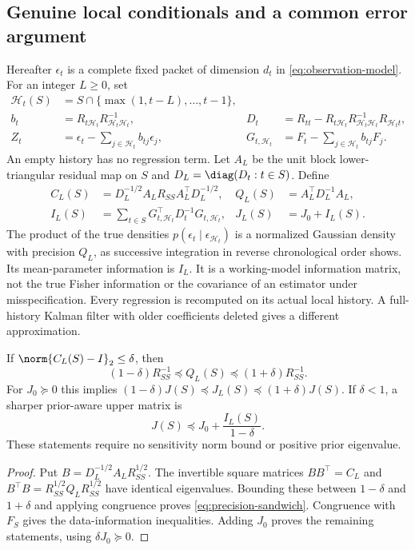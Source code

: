 \subsection{Genuine local conditionals and a common error argument}
\label{subsec:local-conditionals}
Hereafter $\epsilon_t$ is a complete fixed packet of dimension $d_t$ in
\eqref{eq:observation-model}. For an integer $L\ge0$, set
\begin{align}
 \mathcal H_t(S)&=S\cap\{\max(1,t-L),\ldots,t-1\},\nonumber\\
 b_t&=R_{t\mathcal H_t}R_{\mathcal H_t\mathcal H_t}^{-1},&
 D_t&=R_{tt}-R_{t\mathcal H_t}R_{\mathcal H_t\mathcal H_t}^{-1}
                       R_{\mathcal H_t t},\nonumber\\
 Z_t&=\epsilon_t-\sum_{j\in\mathcal H_t}b_{tj}\epsilon_j,&
 G_{t,\mathcal H_t}&=F_t-\sum_{j\in\mathcal H_t}b_{tj}F_j.
 \label{eq:local-conditionals}
\end{align}
An empty history has no regression term. Let $A_L$ be the unit block
lower-triangular residual map on $S$ and $D_L=\diag(D_t:t\in S)$. Define
\begin{align}
 C_L(S)&=D_L^{-1/2}A_LR_{SS}A_L^\top D_L^{-1/2},&
 Q_L(S)&=A_L^\top D_L^{-1}A_L,\nonumber\\
 I_L(S)&=\sum_{t\in S}G_{t,\mathcal H_t}^\top D_t^{-1}G_{t,\mathcal H_t},&
 J_L(S)&=J_0+I_L(S).
 \label{eq:local-precision}
\end{align}
The product of the true densities $p(\epsilon_t\mid\epsilon_{\mathcal H_t})$
is a normalized Gaussian density with precision $Q_L$, as successive
integration in reverse chronological order shows. Its mean-parameter
information is $I_L$. It is a working-model information matrix, not the true
Fisher information or the covariance of an estimator under misspecification.
Every regression is recomputed on its actual local history. A full-history
Kalman filter with older coefficients deleted gives a different approximation.

\begin{lemma}
\label{lem:residual-transfer}
If $\norm{C_L(S)-I}_2\le\delta$, then
\begin{equation}
 (1-\delta)R_{SS}^{-1}\preceq Q_L(S)\preceq(1+\delta)R_{SS}^{-1}.
 \label{eq:precision-sandwich}
\end{equation}
For $J_0\succeq0$ this implies
$(1-\delta)J(S)\preceq J_L(S)\preceq(1+\delta)J(S)$.
If $\delta<1$, a sharper prior-aware upper matrix is
\begin{equation}
 J(S)\preceq J_0+\frac{I_L(S)}{1-\delta}.
 \label{eq:prior-aware-local}
\end{equation}
These statements require no sensitivity norm bound or positive prior eigenvalue.
\end{lemma}
\begin{proof}
Put $B=D_L^{-1/2}A_LR_{SS}^{1/2}$. The invertible square matrices
$BB^\top=C_L$ and $B^\top B=R_{SS}^{1/2}Q_LR_{SS}^{1/2}$ have identical
eigenvalues. Bounding these between $1-\delta$ and $1+\delta$ and applying
congruence proves \eqref{eq:precision-sandwich}. Congruence with $F_S$ gives
the data-information inequalities. Adding $J_0$ proves the remaining
statements, using $\delta J_0\succeq0$.
\end{proof}

